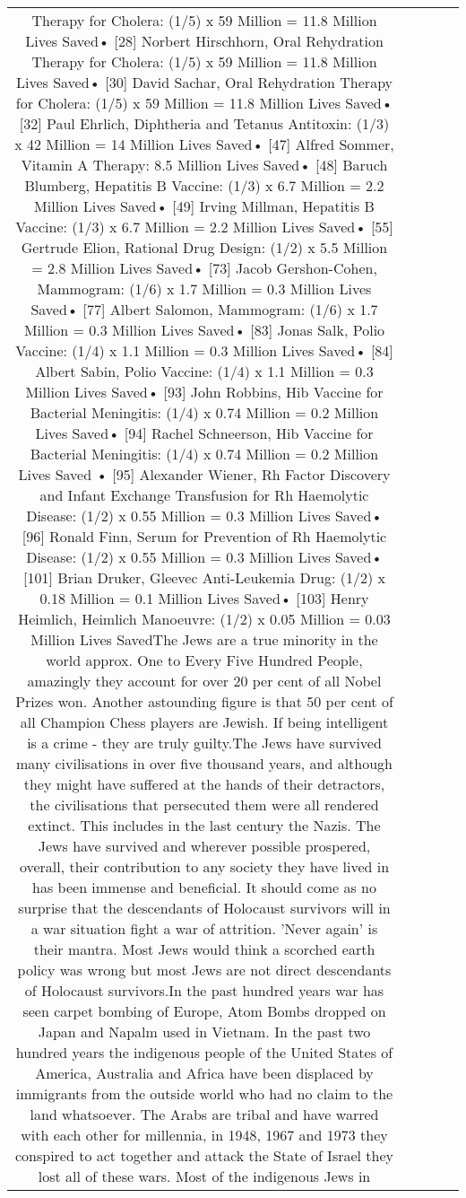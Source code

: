 \documentclass[11pt]{article}
\newlength\mylength
\begin{document}
\begin{center}
\begin{longtable}{|C{.65\mylength}|C{.30\mylength}|C{.12\mylength}|C{.12\mylength}|C{.12\mylength}|}
Therapy for Cholera: (1/5) x 59 Million = 11.8 Million Lives Saved• [28] Norbert Hirschhorn, Oral Rehydration Therapy for Cholera: (1/5) x 59 Million = 11.8 Million Lives Saved• [30] David Sachar, Oral Rehydration Therapy for Cholera: (1/5) x 59 Million = 11.8 Million Lives Saved• [32] Paul Ehrlich, Diphtheria and Tetanus Antitoxin: (1/3) x 42 Million = 14 Million Lives Saved• [47] Alfred Sommer, Vitamin A Therapy: 8.5 Million Lives Saved• [48] Baruch Blumberg, Hepatitis B Vaccine: (1/3) x 6.7 Million = 2.2 Million Lives Saved• [49] Irving Millman, Hepatitis B Vaccine: (1/3) x 6.7 Million = 2.2 Million Lives Saved• [55] Gertrude Elion, Rational Drug Design: (1/2) x 5.5 Million = 2.8 Million Lives Saved• [73] Jacob Gershon-Cohen, Mammogram: (1/6) x 1.7 Million = 0.3 Million Lives Saved• [77] Albert Salomon, Mammogram: (1/6) x 1.7 Million = 0.3 Million Lives Saved• [83] Jonas Salk, Polio Vaccine: (1/4) x 1.1 Million = 0.3 Million Lives Saved• [84] Albert Sabin, Polio Vaccine: (1/4) x 1.1 Million = 0.3 Million Lives Saved• [93] John Robbins, Hib Vaccine for Bacterial Meningitis:  (1/4) x 0.74 Million = 0.2 Million Lives Saved• [94] Rachel Schneerson, Hib Vaccine for Bacterial Meningitis: (1/4) x 0.74 Million = 0.2 Million Lives Saved • [95] Alexander Wiener, Rh Factor Discovery and Infant Exchange Transfusion for Rh Haemolytic Disease: (1/2) x 0.55 Million = 0.3 Million Lives Saved• [96] Ronald Finn, Serum for Prevention of Rh Haemolytic Disease: (1/2) x 0.55 Million = 0.3 Million Lives Saved• [101] Brian Druker, Gleevec Anti-Leukemia Drug: (1/2) x 0.18 Million = 0.1 Million Lives Saved• [103] Henry Heimlich, Heimlich Manoeuvre: (1/2) x 0.05 Million = 0.03 Million Lives SavedThe Jews are a true minority in the world approx. One to Every Five Hundred People, amazingly they account for over 20 per cent of all Nobel Prizes won. Another astounding figure is that 50 per cent of all Champion Chess players are Jewish. If being intelligent is a crime - they are truly guilty.The Jews have survived many civilisations in over five thousand years, and although they might have suffered at the hands of their detractors, the civilisations that persecuted them were all rendered extinct. This includes in the last century the Nazis. The Jews have survived and wherever possible prospered, overall, their contribution to any society they have lived in has been immense and beneficial. It should come as no surprise that the descendants of Holocaust survivors will in a war situation fight a war of attrition. 'Never again' is their mantra. Most Jews would think a scorched earth policy was wrong but most Jews are not direct descendants of Holocaust survivors.In the past hundred years war has seen carpet bombing of Europe, Atom Bombs dropped on Japan and Napalm used in Vietnam. In the past two hundred years the indigenous people of the United States of America, Australia and Africa have been displaced by immigrants from the outside world who had no claim to the land whatsoever. The Arabs are tribal and have warred with each other for millennia, in 1948, 1967 and 1973 they conspired to act together and attack the State of Israel they lost all of these wars. Most of the indigenous Jews in 
\end{longtable}
\end{center}
\end{document}
